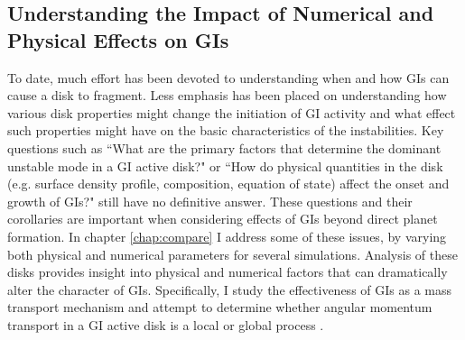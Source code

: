 
\begin{spacing}{1.0}
\subsection{Understanding the Impact of Numerical and Physical Effects on GIs}\label{sec:under}
\end{spacing}

To date, much effort has been devoted to understanding when and how GIs can cause a disk to fragment. Less emphasis has been placed on understanding how various disk properties might change the initiation of GI activity and what effect such properties might have on the basic characteristics of the instabilities. Key questions such as ``What are the primary factors that determine the dominant unstable mode in a GI active disk?" or ``How do physical quantities in the disk (e.g. surface density profile, composition, equation of state) affect the onset and growth of GIs?" still have no definitive answer. These questions and their corollaries are important when considering effects of GIs beyond direct planet formation. In chapter \ref{chap:compare} I address some of these issues, by varying both physical and numerical parameters for several simulations. Analysis of these disks provides insight into physical and numerical factors that can dramatically alter the  character of GIs. Specifically, I study the effectiveness of GIs as a mass transport mechanism and attempt to determine whether angular momentum transport in a GI active disk is a local or global process \citep{balbus1999,vorobyov2010}.

